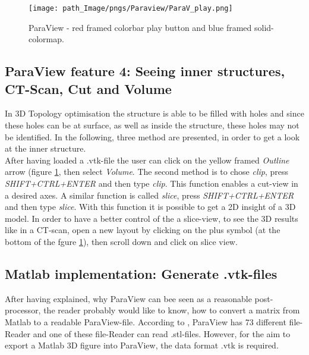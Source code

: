 \begin{figure}[!h]
 \centering
   \texttt{[image: path\_Image/pngs/Paraview/ParaV\_play.png]}
 	\caption{ParaView - red framed colorbar play button and blue framed  solid-colormap.} 
 	\label{fig_Para_solid_color}
 \end{figure} 
 

\subsection{ParaView feature 4: Seeing inner structures,  CT-Scan, Cut and Volume}
In 3D Topology optimisation  the structure is able to be filled with holes and since these holes can be at surface, as well as inside the structure, these holes may not be identified. In the following, three method are presented, in order to get a look at the inner structure.\\

After having loaded a .vtk-file the user can click on the yellow framed
\emph{Outline} arrow (figure \ref{fig_Para_solid_color},
then select \emph{Volume}. The second method is to chose \emph{clip}, press
\textit{SHIFT+CTRL+ENTER} and then type \textit{clip}. This function enables
a cut-view in a desired axes. A similar function is called \emph{slice}, press
\textit{SHIFT+CTRL+ENTER} and then type \textit{slice}. With this function it is possible to get
a 2D insight of a 3D model. In order to have a better control of
the a slice-view, to see
the 3D results like in a CT-scan, open a new layout by clicking
on the plus symbol (at the bottom of the fgure \ref{fig_Para_solid_color}), then
scroll down and click on slice view. 
 

\subsection{Matlab implementation: Generate .vtk-files}
\label{subsection_generate_vtk}
After having explained, why ParaView can bee seen as a reasonable post-processor, the reader
 probably would like to know, how to convert a matrix from Matlab to a readable ParaView-file. According to \cite{.29.11.2018}, ParaView has 73 different file-Reader and one of these file-Reader can read .stl-files. However, for the aim to export a Matlab 3D figure into ParaView, the data format .vtk is required.\\

